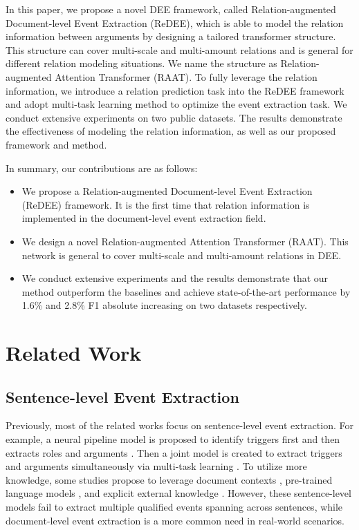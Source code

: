 \documentclass[11pt]{article}
\begin{document}
In this paper, we propose a novel DEE framework, called Relation-augmented Document-level Event Extraction (ReDEE), which is able to model the relation information between arguments by designing a tailored transformer structure. This structure can cover multi-scale and multi-amount relations and is general for different relation modeling situations. We name the structure as Relation-augmented Attention Transformer (RAAT). To fully leverage the relation information, we introduce a relation prediction task into the ReDEE framework and adopt multi-task learning method to optimize the event extraction task. We conduct extensive experiments on two public datasets. The results demonstrate the effectiveness of modeling the relation information, as well as our proposed framework and method.



In summary, our contributions are as follows:
\begin{itemize}
\item We propose a Relation-augmented Document-level Event Extraction (ReDEE) framework. It is the first time that relation information is implemented in the document-level event extraction field.

\item We design a novel Relation-augmented Attention Transformer (RAAT). This network is general to cover multi-scale and multi-amount relations in DEE. 


\item We conduct extensive experiments and the results demonstrate that our method outperform the baselines and achieve state-of-the-art performance by 1.6\% and 2.8\% F1 absolute increasing on two datasets respectively.
\end{itemize}

\section{Related Work}

\subsection{Sentence-level Event Extraction}

Previously, most of the related works focus on sentence-level event extraction. For example, a neural pipeline model is proposed to identify triggers first and then extracts roles and arguments \cite{Yubo-see}. Then a joint model is created to extract triggers and arguments simultaneously via multi-task learning \citep{Thien-see,Lei-see}. To utilize more knowledge, some studies propose to leverage document contexts \citep{Yubo-see1,Yue-see}, pre-trained language models \cite{Sen-see}, and explicit external knowledge \citep{Jian-see,Meihan-see}. However, these sentence-level models fail to extract multiple qualified events spanning across sentences, while document-level event extraction is a more common need in real-world scenarios. 
\end{document}
